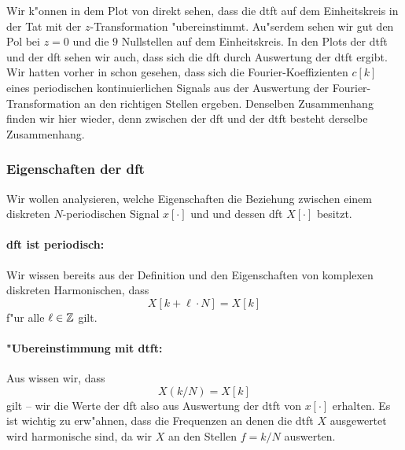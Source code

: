 Wir k"onnen in dem Plot von  direkt sehen, dass die \gls{dtft} auf dem Einheitskreis in der Tat mit der $z$-Transformation "ubereinstimmt.
Au"serdem sehen wir gut den Pol bei $z=0$ und die $9$ Nullstellen auf dem Einheitskreis.
In den Plots der \gls{dtft} und der \gls{dft} sehen wir auch, dass sich die \gls{dft} durch Auswertung der \gls{dtft} ergibt.
Wir hatten vorher in  schon gesehen, dass sich die Fourier-Koeffizienten $c[k]$ eines periodischen kontinuierlichen Signals aus der Auswertung der Fourier-Transformation an den richtigen Stellen ergeben.
Denselben Zusammenhang finden wir hier wieder, denn zwischen der \gls{dft} und der \gls{dtft} besteht derselbe Zusammenhang.
%
\subsubsection{Eigenschaften der \texorpdfstring{\acrshort*{dft}}{DFT}}
%
Wir wollen analysieren, welche Eigenschaften die Beziehung zwischen einem diskreten $N$-periodischen Signal $x[\cdot]$ und und dessen \gls{dft} $X[\cdot]$ besitzt.

\paragraph{\gls{dft} ist periodisch:} Wir wissen bereits aus der Definition und den Eigenschaften von komplexen diskreten Harmonischen, dass
    \[
    X[k + \ell \cdot N] = X[k]
    \]
    f"ur alle $\ell \in \mathbb{Z}$ gilt.
\paragraph{"Ubereinstimmung mit \gls{dtft}:} Aus  wissen wir, dass
    \[
    X(k/N) = X[k]
    \]
    gilt -- wir die Werte der \gls{dft} also aus Auswertung der \gls{dtft} von $x[\cdot]$ erhalten.
    Es ist wichtig zu erw"ahnen, dass die Frequenzen an denen die \gls{dtft} $X$ ausgewertet wird harmonische  sind, da wir $X$ an den Stellen $f = k/N$ auswerten.
